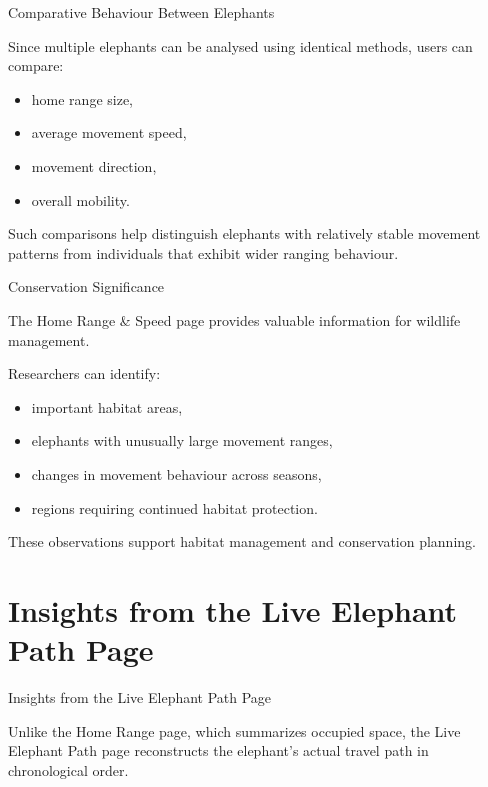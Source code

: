 \documentclass{beamer}
\begin{document}
	
		\begin{frame}{Comparative Behaviour Between Elephants}
		
		Since multiple elephants can be analysed using identical methods, users can compare:
		
		\begin{itemize}
			\item home range size,
			\item average movement speed,
			\item movement direction,
			\item overall mobility.
		\end{itemize}
		
		Such comparisons help distinguish elephants with relatively stable movement patterns from individuals that exhibit wider ranging behaviour.
	\end{frame}	
	
	
	
	
	
	
		\begin{frame}{Conservation Significance}
		
		The Home Range \& Speed page provides valuable information for wildlife management.
		
		Researchers can identify:
		
		\begin{itemize}
			\item important habitat areas,
			\item elephants with unusually large movement ranges,
			\item changes in movement behaviour across seasons,
			\item regions requiring continued habitat protection.
		\end{itemize}
		
		These observations support habitat management and conservation planning.
	\end{frame}	
	
	
	
	
	
	
	\section{Insights from the Live Elephant Path Page}
		\begin{frame}{Insights from the Live Elephant Path Page}
		
		\Large
		
		Unlike the Home Range page, which summarizes occupied space, the Live Elephant Path page reconstructs the elephant's actual travel path in chronological order.
	\end{frame}	
	
\end{document}
